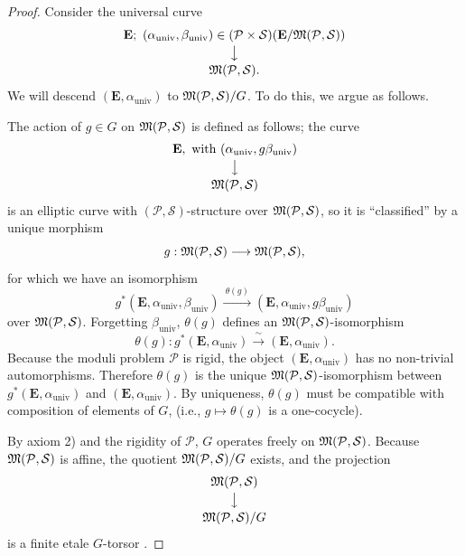 \begin{proof}
Consider the universal curve
\[
\begin{array}{@{}c@{}}
\mathbf{E}; \ (\alpha_{\mathrm{univ}}, \beta_{\mathrm{univ}}) \in (\mathcal{P} \times \mathcal{S})(\mathbf{E}/\Mfrak(\mathcal{P}, \mathcal{S})) \\[2pt]
\big\downarrow \\[2pt]
\Mfrak(\mathcal{P}, \mathcal{S}).
\end{array}
\]
We will descend $(\mathbf{E}, \alpha_{\mathrm{univ}})$ to $\mathfrak{M}(\mathcal{P}, \mathcal{S})/G$. To do this, we argue as follows.

The action of $g \in G$ on $\mathfrak{M}(\mathcal{P}, \mathcal{S})$ is defined as follows; the curve
\[
\begin{array}{@{}c@{}}
\mathbf{E}, \text{ with } (\alpha_{\mathrm{univ}}, g\beta_{\mathrm{univ}}) \\[2pt]
\big\downarrow \\[2pt]
\Mfrak(\mathcal{P}, \mathcal{S})
\end{array}
\]
is an elliptic curve with $(\mathcal{P}, \mathcal{S})$-structure over $\mathfrak{M}(\mathcal{P}, \mathcal{S})$, so it is ``classified'' by a unique morphism
\[
g : \mathfrak{M}(\mathcal{P}, \mathcal{S}) \longrightarrow \mathfrak{M}(\mathcal{P}, \mathcal{S}),
\]
for which we have an isomorphism
\[
g^*(\mathbf{E}, \alpha_{\mathrm{univ}}, \beta_{\mathrm{univ}}) \xrightarrow{\ \theta(g)\ } (\mathbf{E}, \alpha_{\mathrm{univ}}, g\beta_{\mathrm{univ}})
\]
over $\mathfrak{M}(\mathcal{P}, \mathcal{S})$. Forgetting $\beta_{\mathrm{univ}}$, $\theta(g)$ defines an $\mathfrak{M}(\mathcal{P}, \mathcal{S})$-isomorphism
\[
\theta(g) : g^*(\mathbf{E}, \alpha_{\mathrm{univ}}) \xrightarrow{\ \sim\ } (\mathbf{E}, \alpha_{\mathrm{univ}}).
\]
Because the moduli problem $\mathcal{P}$ is rigid, the object $(\mathbf{E}, \alpha_{\mathrm{univ}})$ has no non-trivial automorphisms. Therefore $\theta(g)$ is the unique $\mathfrak{M}(\mathcal{P}, \mathcal{S})$-isomorphism between $g^*(\mathbf{E}, \alpha_{\mathrm{univ}})$ and $(\mathbf{E}, \alpha_{\mathrm{univ}})$. By uniqueness, $\theta(g)$ must be compatible with composition of elements of $G$, (i.e., $g \mapsto \theta(g)$ is a one-cocycle).

By axiom 2) and the rigidity of $\mathcal{P}$, $G$ operates freely on $\mathfrak{M}(\mathcal{P}, \mathcal{S})$. Because $\mathfrak{M}(\mathcal{P}, \mathcal{S})$ is affine, the quotient $\mathfrak{M}(\mathcal{P}, \mathcal{S})/G$ exists, and the projection
\[
\begin{array}{@{}c@{}}
\Mfrak(\mathcal{P}, \mathcal{S}) \\[2pt]
\big\downarrow \\[2pt]
\Mfrak(\mathcal{P}, \mathcal{S})/G
\end{array}
\]
is a finite etale $G$-torsor \cite[III, 2, 6.1]{DeGa} \cite[III, Exp.~V, 4.1]{SGA}.


\end{proof}
